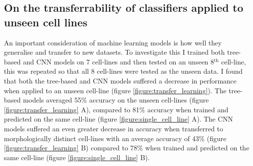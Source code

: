 \documentclass[a4paper,11pt,twoside,openright]{scrbook}
\begin{document}
\subsection{On the transferrability of classifiers applied to unseen cell lines}

An important consideration of machine learning models is how well they generalise and transfer to new datasets.
To investigate this I trained both tree-based and CNN models on 7 cell-lines and then tested on an unseen 8$^\text{th}$ 
cell-line, this was repeated so that all 8 cell-lines were tested as the unseen data.
I found that both the tree-based and CNN models suffered a decrease in performance when applied to an unseen cell-line 
(figure \ref{figure:transfer_learning}).
The tree-based models averaged 55\% accuracy on the unseen cell-lines (figure \ref{figure:transfer_learning} A), 
compared to 81\% accuracy when trained and predicted on the same cell-line (figure \ref{figure:single_cell_line} A).
The CNN models suffered an even greater decrease in accuracy when transferred to morphologically distinct cell-lines 
with an average accuracy of 43\% (figure \ref{figure:transfer_learning} B) compared to 78\% when trained and predicted 
on the same cell-line (figure \ref{figure:single_cell_line} B).
\end{document}
